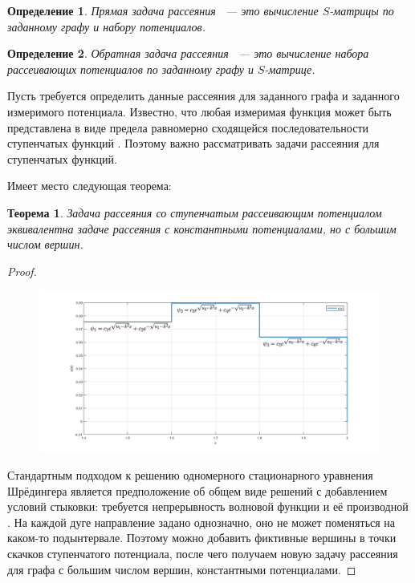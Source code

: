 \documentclass[a4 paper, 12 pt]{extarticle}
\newtheorem{theorem}{Теорема}[section]
\newtheorem{Def}{Определение}[section]
\begin{document}
   \begin{Def}
   	Прямая задача рассеяния ~--- это вычисление $S$-матрицы по заданному  графу и набору потенциалов.
   \end{Def}

   \begin{Def}
   	Обратная задача рассеяния ~--- это вычисление набора рассеивающих потенциалов по заданному графу и $S$-матрице.
   \end{Def}

   Пусть требуется определить данные рассеяния для заданного графа и заданного измеримого потенциала. Известно, что любая измеримая функция может быть представлена в виде предела равномерно сходящейся последовательности ступенчатых функций \cite{Kolmogorov}. Поэтому важно рассматривать задачи рассеяния для ступенчатых функций.
   
   Имеет место следующая теорема:
   \begin{theorem}
   	Задача рассеяния со ступенчатым рассеивающим потенциалом эквивалентна задаче рассеяния с константными потенциалами, но с большим числом вершин.
   \end{theorem}
   \begin{proof}
   	\begin{figure}[!htb]
   		\centering
   		\includegraphics[scale=0.5]{step.png}
   	\end{figure}
   	Стандартным подходом к решению одномерного стационарного уравнения Шрёдингера является предположение об общем виде решений с добавлением условий стыковки: требуется непрерывность волновой функции и её производной \cite{Peisakhovich}. На каждой дуге направление задано однозначно, оно не может поменяться на каком-то подынтервале. Поэтому можно добавить фиктивные вершины в точки скачков ступенчатого потенциала, после чего получаем новую задачу рассеяния для графа с большим числом вершин, константными потенциалами. 
   \end{proof}
      
\end{document}

